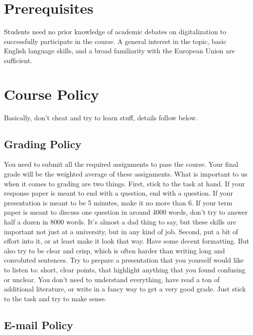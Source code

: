 \documentclass[12pt,]{article}
\begin{document}
\hypertarget{prerequisites}{%
\section{Prerequisites}\label{prerequisites}}

Students need no prior knowledge of academic debates on digitalization
to successfully participate in the course. A general interest in the
topic, basic English language skills, and a broad familiarity with the
European Union are sufficient.

\hypertarget{course-policy}{%
\section{Course Policy}\label{course-policy}}

Basically, don't cheat and try to learn stuff, details follow below.

\hypertarget{grading-policy}{%
\subsection{Grading Policy}\label{grading-policy}}

You need to submit all the required assignments to pass the course. Your
final grade will be the weighted average of these assignments. What is
important to us when it comes to grading are two things. First, stick to
the task at hand. If your response paper is meant to end with a
question, end with a question. If your presentation is meant to be 5
minutes, make it no more than 6. If your term paper is meant to discuss
one question in around 4000 words, don't try to answer half a dozen in
8000 words. It's almost a dad thing to say, but these skills are
important not just at a university, but in any kind of job. Second, put
a bit of effort into it, or at least make it look that way. Have some
decent formatting. But also try to be clear and crisp, which is often
harder than writing long and convoluted sentences. Try to prepare a
presentation that you yourself would like to listen to: short, clear
points, that highlight anything that you found confusing or unclear. You
don't need to understand everything, have read a ton of additional
literature, or write in a fancy way to get a very good grade. Just stick
to the task and try to make sense.

\hypertarget{e-mail-policy}{%
\subsection{E-mail Policy}\label{e-mail-policy}}
\end{document}
